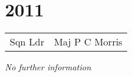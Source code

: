 \chapter*{2011}

\begin{center}
  \small
  \begin{tabular}{rl}
    Sqn Ldr & Maj P C Morris \\
  \end{tabular}
\end{center}

\begin{center}
  \textit{No further information}
\end{center}

\vspace{50mm}

\pagebreak
